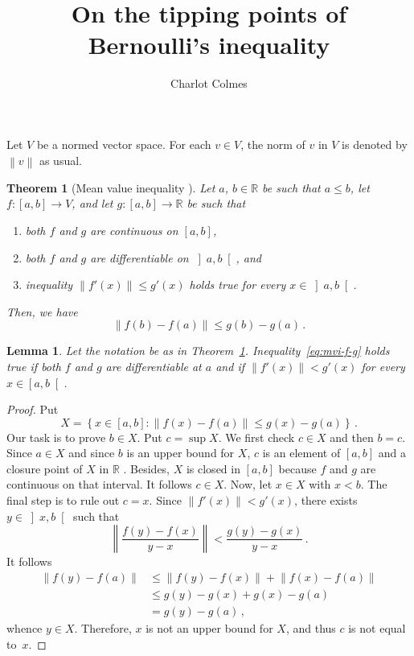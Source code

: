 \documentclass[12pt]{article}
\newcommand{\bR}{\mathbb{R}}
\newcommand{\norm}[1]{\left\| #1 \right\|}
\newtheorem{theorem}{Theorem}
\newtheorem{lemma}{Lemma}
\begin{document}
\title{On the tipping points of Bernoulli's inequality}
\author{Charlot Colmes}
\maketitle 

\sloppy

Let $V$ be a normed vector space.
For each $v \in V$, the norm of $v$ in $V$ is denoted by $\norm{v}$ as usual.

\begin{theorem}[Mean value inequality \cite{Coleman-calculus}] \label{thm:mvi}
  Let $a$, $b \in \bR$ be such that $a \le b$,
  let $f\colon [a, b] \to V$, and let $g\colon [a, b] \to \bR$ be such that
  \begin{enumerate}
  \item both $f$ and $g$ are continuous on $[a, b]$,
  \item both $f$ and $g$ are differentiable on $\left]a, b \right[$, and
  \item inequality $\norm{f'(x)} \le g'(x)$ holds true for every $x \in \left]a, b \right[$.
  \end{enumerate}
  Then, we have 
  \begin{equation} \label{eq:mvi-f-g}
    \norm{f(b) - f(a)} \le g(b) - g(a) \, .
  \end{equation} 
\end{theorem}

\begin{lemma} \label{lem:mvi}
  Let the notation be as in Theorem~\ref{thm:mvi}.
  Inequality~\eqref{eq:mvi-f-g} holds true
  if both $f$ and $g$ are differentiable at $a$
  and
  if $\norm{f'(x)} < g'(x)$ for every $x \in \left[a, b \right[$.  
\end{lemma}

\begin{proof}
  Put
  $$
  X = \left\{ x \in [a, b] : \norm{f(x) - f(a)}  \le g(x) - g(a) \right\} \, .
  $$
  Our task is to prove $b \in X$.
  Put $c = \sup X$.  
  We first check $c \in X$ and then $b = c$.
  Since $a \in X$ and since $b$ is an upper bound for $X$,
  $c$ is
  an element of $[a, b]$
  and
  a closure point of $X$ in $\bR$ \cite{RudinPrinciples}.
  Besides, $X$ is closed in $[a, b]$ because $f$ and $g$ are continuous on that interval.
  It follows $c \in X$.
  Now, let $x \in X$ with $x < b$.
  The final step is to rule out $c = x$.
  Since $\norm{f'(x)} < g'(x)$,
  there exists $y \in \left]x, b\right[$ such that
  $$
  \norm{\frac{f(y)  - f(x)}{y - x}} < \frac{g(y) - g(x)}{y - x}  \, .
  $$
  It follows 
  \begin{align*}
    \norm{f(y) - f(a)}
    & \le \norm{f(y) - f(x)} + \norm{f(x) - f(a)} \\
    & \le g(y) - g(x) + g(x) - g(a)   \\
    & = g(y) - g(a)  \,, 
  \end{align*}
  whence $y \in X$.
  Therefore, $x$ is not an upper bound for $X$, and thus $c$ is not equal to~$x$.
\end{proof}
\end{document}
